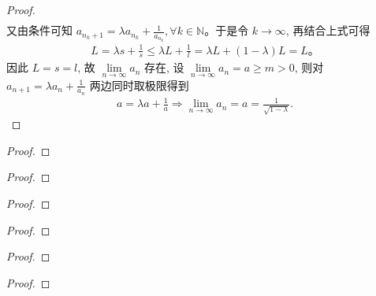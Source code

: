 \documentclass[lang=cn,newtx,10pt,scheme=chinese]{../Template/elegantbook}
\begin{document}
\begin{proof}
\begin{align*}
\end{align*}
又由条件可知 $a_{n_k+1}=\lambda a_{n_k}+\frac{1}{a_{n_k}},\forall k\in \mathbb{N}$。于是令 $k\rightarrow \infty$, 再结合上式可得
\begin{align*}
L=\lambda s+\frac{1}{s}\leqslant \lambda L+\frac{1}{l}=\lambda L+\left( 1-\lambda \right) L=L。
\end{align*}
因此 $L=s=l$, 故 $\underset{n\rightarrow \infty}{\lim}a_n$ 存在, 设 $\underset{n\rightarrow \infty}{\lim}a_n=a\geqslant m>0$, 则对 $a_{n+1}=\lambda a_n+\frac{1}{a_n}$ 两边同时取极限得到
\begin{align*}
a=\lambda a+\frac{1}{a}\Rightarrow \underset{n\rightarrow \infty}{\lim}a_n=a=\frac{1}{\sqrt{1-\lambda}}.
\end{align*}
\end{proof}

\begin{example}

\end{example}
\begin{proof}

\end{proof}

\begin{example}

\end{example}
\begin{proof}

\end{proof}

\begin{example}

\end{example}
\begin{proof}

\end{proof}

\begin{example}

\end{example}
\begin{proof}

\end{proof}

\begin{example}

\end{example}
\begin{proof}

\end{proof}

\begin{example}

\end{example}
\begin{proof}

\end{proof}
\end{document}
